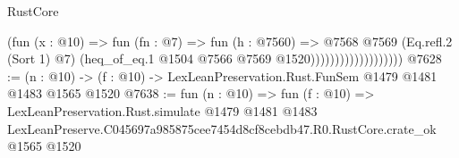 \begin{lexlean}{RustCore}
\begin{coremodule}
                                      (fun (x : @10) =>
                                      fun (fn : @7) =>
                                      fun (h : @7560) =>
                                      @7568
                                        @7569
                                        (Eq.refl.{2} (Sort 1) @7)
                                        (heq_of_eq.{1} @1504 @7566 @7569 @1520)))))))))))))))))))
@7628 := (n : @10) -> (f : @10) -> LexLeanPreservation.Rust.FunSem @1479 @1481 @1483 @1565 @1520
@7638 := fun (n : @10) =>
  fun (f : @10) =>
  LexLeanPreservation.Rust.simulate
    @1479
    @1481
    @1483
    LexLeanPreserve.C045697a985875cee7454d8cf8cebdb47.R0.RustCore.crate_ok
    @1565
    @1520
\end{coremodule}
\end{lexlean}
